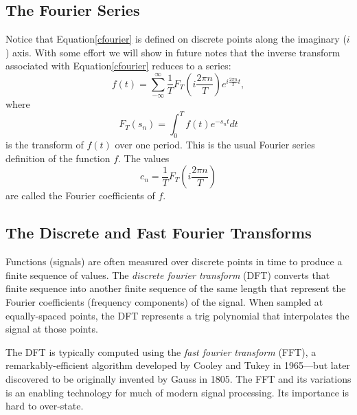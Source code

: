 \documentclass[10pt]{article}
\begin{document}
\subsection*{The Fourier Series}

Notice that Equation\eqref{cfourier} is defined on discrete points along the imaginary ($i$) axis.
With some effort we will show in future notes that the inverse transform associated
with Equation\eqref{cfourier} reduces to a series:
\begin{equation}\label{fourier}
f(t) = \sum_{-\infty}^{\infty}\dfrac{1}{T}F_T\left(i\dfrac{2\pi n}{T}\right)e^{i\frac{2\pi n}{T}t},
\end{equation}
where 
\[
F_T(s_n) = \int_0^T f(t) e^{-s_n t}dt
\]
is the transform of $f(t)$ over one period. This is the usual Fourier series definition
of the function $f$.
The values
\[
c_n = \dfrac{1}{T}F_T\left(i\dfrac{2\pi n}{T}\right)
\]
are called the Fourier coefficients of $f$.


\subsection*{The Discrete and Fast Fourier Transforms}

Functions (signals) are often measured over discrete points in
time to produce a finite sequence of values.  The \emph{discrete fourier
transform} (DFT) converts that finite sequence into another finite sequence of
the same length that represent the Fourier coefficients (frequency components)
of the signal. When sampled at equally-spaced points, the DFT represents a trig
polynomial that interpolates the signal at those points.

The DFT is typically computed using the \emph{fast fourier transform} (FFT), a
remarkably-efficient algorithm developed by Cooley and Tukey in 1965---but
later discovered to be originally invented by Gauss in 1805. The FFT and its
variations is an enabling technology for much of modern signal processing. Its
importance is hard to over-state.
\end{document}
